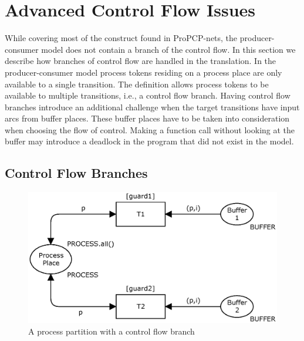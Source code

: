 \section{Advanced Control Flow Issues}
\label{sec:advancedissues}

While covering most of the construct found in ProPCP-nets, the producer-consumer model does not contain a branch of the control flow. In this section we describe how branches of control flow are handled in the translation. In the producer-consumer model process tokens residing on a process place are only available to a single transition. The definition allows process tokens to be available to multiple transitions, i.e., a control flow branch. Having control flow branches introduce an additional challenge when the target transitions have input arcs from buffer places. These buffer places have to be taken into consideration when choosing the flow of control. Making a function call without looking at the buffer may introduce a deadlock in the program that did not exist in the model.

\subsection{Control Flow Branches}

\begin{figure}[b!]
\centering
\includegraphics[scale=0.5]{translation/advancedissues/graphics/cffcpn.eps}
\caption{A process partition with a control flow branch}
\label{fig:cffcpn}
\end{figure}

